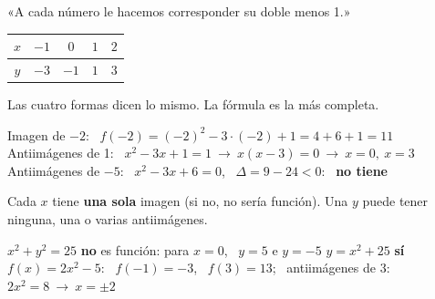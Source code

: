 \documentclass[11pt,a4paper]{article}
\newcommand{\comic}{\fontfamily{ComicNeue-TLF}\selectfont}
\newcommand{\miniax}[4]{\draw[-{Latex[length=1.5mm]},fmmuted,line width=0.6pt] (#1,0)--(#2,0); \draw[-{Latex[length=1.5mm]},fmmuted,line width=0.6pt] (0,#3)--(0,#4);}
\begin{document}
\vfill
\begin{tcbraster}[raster columns=4,raster equal height,raster column skip=6pt]
\begin{tcolorbox}[fmbase,colback=fmdefbg,colframe=fmdef,coltitle=white,title={Enunciado}]
\small«A cada número le hacemos corresponder su doble menos 1.»
\end{tcolorbox}
\begin{tcolorbox}[fmbase,colback=fmdefbg,colframe=fmdef,coltitle=white,title={Fórmula},before upper=\centering]
\vspace*{3mm}{\large$f(x)=2x-1$}
\end{tcolorbox}
\begin{tcolorbox}[fmbase,colback=fmdefbg,colframe=fmdef,coltitle=white,title={Tabla},before upper=\centering,left=1mm,right=1mm]
\small\setlength{\tabcolsep}{3pt}\begin{tabular}{c|cccc}$x$&$-1$&$0$&$1$&$2$\\\hline $y$&$-3$&$-1$&$1$&$3$\end{tabular}
\end{tcolorbox}
\begin{tcolorbox}[fmbase,colback=fmdefbg,colframe=fmdef,coltitle=white,title={Gráfica},before upper=\centering]
\end{tcolorbox}
\end{tcbraster}
{\comic\color{fmmuted}\centering Las cuatro formas dicen lo mismo. La fórmula es la más completa.\par}

\vfill
\begin{exemple}[Ejemplo: \ $f(x)=x^2-3x+1$]
Imagen de $-2$: \ $f(-2)=(-2)^2-3\cdot(-2)+1=4+6+1=\boxed{11}$\\[4pt]
Antiimágenes de 1: \ $x^2-3x+1=1\ \to\ x(x-3)=0\ \to\ \boxed{x=0,\ x=3}$\\[4pt]
Antiimágenes de $-5$: \ $x^2-3x+6=0$, \ $\Delta=9-24<0$: \ \textbf{no tiene}
\end{exemple}

\vfill
\begin{compte}
Cada $x$ tiene \textbf{una sola} imagen (si no, no sería función). Una $y$ puede tener ninguna, una o varias antiimágenes.
\end{compte}

\vfill
\begin{exemple}[Ejemplos]
$x^2+y^2=25$ \textbf{no} es función: para $x=0$, \ $y=5$ e $y=-5$ \qquad $y=x^2+25$ \textbf{sí}\\[4pt]
$f(x)=2x^2-5$: \ $f(-1)=-3$, \ $f(3)=13$; \ antiimágenes de 3: \ $2x^2=8\ \to\ x=\pm2$
\end{exemple}
\end{document}
